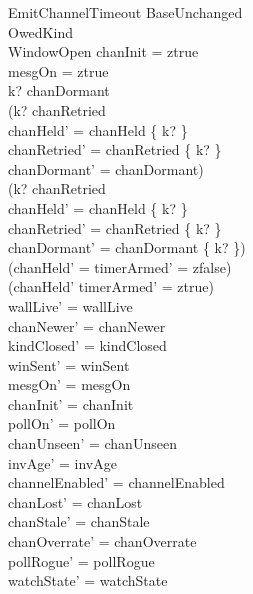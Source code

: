 \documentclass[a4paper,10pt,fleqn]{article}
\begin{document}
\begin{schema}{EmitChannelTimeout}
  BaseUnchanged \\
  OwedKind \\
  WindowOpen
  \where
  chanInit = ztrue \\
  mesgOn = ztrue \\
  k? \notin chanDormant \\
  (k? \notin chanRetried \implies \\
  \quad chanHeld' = chanHeld \cup \{ k? \} \land \\
  \quad chanRetried' = chanRetried \cup \{ k? \} \land \\
  \quad chanDormant' = chanDormant) \\
  (k? \in chanRetried \implies \\
  \quad chanHeld' = chanHeld \setminus \{ k? \} \land \\
  \quad chanRetried' = chanRetried \setminus \{ k? \} \land \\
  \quad chanDormant' = chanDormant \cup \{ k? \}) \\
  (chanHeld' = \emptyset \implies timerArmed' = zfalse) \\
  (chanHeld' \neq \emptyset \implies timerArmed' = ztrue) \\
  wallLive' = wallLive \\
  chanNewer' = chanNewer \\
  kindClosed' = kindClosed \\
  winSent' = winSent \\
  mesgOn' = mesgOn \\
  chanInit' = chanInit \\
  pollOn' = pollOn \\
  chanUnseen' = chanUnseen \\
  invAge' = invAge \\
  channelEnabled' = channelEnabled \\
  chanLost' = chanLost \\
  chanStale' = chanStale \\
  chanOverrate' = chanOverrate \\
  pollRogue' = pollRogue \\
  watchState' = watchState
\end{schema}
\end{document}
